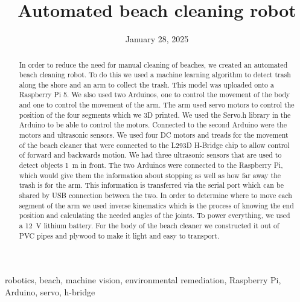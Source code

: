 \documentclass[12pt,conference,onecolumn]{IEEEtran}
\title{Automated beach cleaning robot}
\author{%
\IEEEauthorblockN{Srikar Baru}\IEEEauthorblockA{Science \& Engineering\\Manalapan High School\\Englishtown, NJ\\425sbaru@frhsd.com}\and 
\IEEEauthorblockN{Kevin Tomazic}\IEEEauthorblockA{Science \& Engineering\\Manalapan High School\\Englishtown, NJ\\425ktomazic@frhsd.com}}
\date{January 28, 2025}
\newcommand{\keywords}{robotics, beach, machine vision, environmental remediation, Raspberry Pi, Arduino, servo, h-bridge}
\begin{document}
\maketitle 

\begin{abstract}
In order to reduce the need for manual cleaning of beaches, we created an automated beach cleaning robot. To do this we used a machine learning algorithm to detect trash along the shore and an arm to collect the trash. This model was uploaded onto a Raspberry Pi 5. We also used two Arduinos, one to control the movement of the body and one to control the movement of the arm. The arm used servo motors to control the position of the four segments which we 3D printed. We used the Servo.h library in the Arduino to be able to control the motors. Connected to the second Arduino were the motors and ultrasonic sensors. We used four DC motors and treads for the movement of the beach cleaner that were connected to the L293D H-Bridge chip to allow control of forward and backwards motion. We had three ultrasonic sensors that are used to detect objects \qty{1}{\meter} in front. The two Arduinos were connected to the Raspberry Pi, which would give them the information about stopping as well as how far away the trash is for the arm. This information is transferred via the serial port which can be shared by USB connection between the two. In order to determine where to move each segment of the arm we used inverse kinematics which is the process of knowing the end position and calculating the needed angles of the joints. To power everything, we used a \qty{12}{\volt} lithium battery. For the body of the beach cleaner we constructed it out of PVC pipes and plywood to make it light and easy to transport.
\end{abstract}

\begin{IEEEkeywords}
\keywords
\end{IEEEkeywords}
\end{document}
